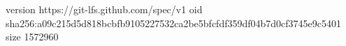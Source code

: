 version https://git-lfs.github.com/spec/v1
oid sha256:a09c215d5d818bcbfb9105227532ca2be5bfcfdf359df04b7d0cf3745e9c5401
size 1572960
